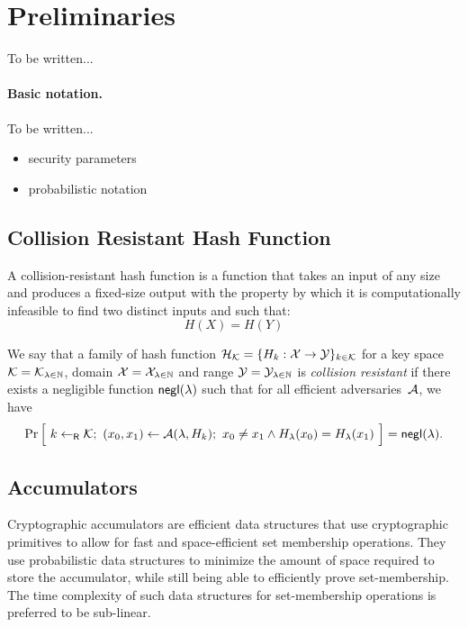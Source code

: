 \section{Preliminaries}

To be written...

\paragraph{Basic notation.}
\label{sec:notation}

To be written...
\begin{itemize}[noitemsep]
    \item security parameters
    \item probabilistic notation
\end{itemize}

\subsection{Collision Resistant Hash Function}

A collision-resistant hash function is a function  that takes an input 
of any size and produces a fixed-size output with the property by which it is 
computationally infeasible to find two distinct inputs  and  
such that: 
\begin{equation} H(X) = H(Y)\end{equation}

\newcommand{\getsr}{\gets_{\ms{R}}}

\begin{definition}
    We say that a family of hash function $\mathcal{H}_{\mathcal{K}} = \{ H_k: \mathcal{X} \to
    \mathcal{Y} \}_{k \in \mathcal{K}}$ for a key space $\mathcal{K} = \mathcal{K}_{\lambda \in \mathbb{N}}$,
    domain $\mathcal{X} = \mathcal{X}_{\lambda \in \mathbb{N}}$ and range $\mathcal{Y} = \mathcal{Y}_{\lambda
    \in \mathbb{N}}$ is \emph{collision resistant} if there exists a negligible
    function $\mathsf{negl}(\lambda)$ such that for all efficient adversaries~$\mathcal{A}$,
    we have
    \[ \Pr\Big[~ k \getsr \calK;~ (x_0, x_1) \gets \calA(\lambda, H_k);~
    x_0 \neq x_1 \land H_\lambda(x_0) = H_\lambda(x_1) ~\Big] = \negl(\lambda)
.\]
\end{definition}

\subsection{Accumulators}

Cryptographic accumulators are efficient data structures that use cryptographic 
primitives to allow for fast and space-efficient set membership operations. They
use probabilistic data structures to minimize the amount of space required to 
store the accumulator, while still being able to efficiently prove set-membership.
The time complexity of such data structures for set-membership operations is 
preferred to be sub-linear.

